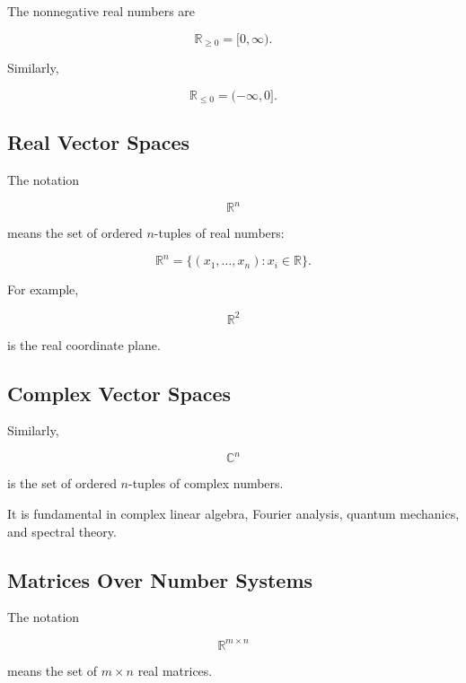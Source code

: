 The nonnegative real numbers are

\[
\boxed{
\mathbb{R}_{\geq0}
=
[0,\infty).
}
\]

Similarly,

\[
\boxed{
\mathbb{R}_{\leq0}
=
(-\infty,0].
}
\]

\subsection{Real Vector Spaces}
\label{subsec:real-vector-space-reference}

The notation

\[
\boxed{
\mathbb{R}^n
}
\]

means the set of ordered \(n\)-tuples of real numbers:

\[
\boxed{
\mathbb{R}^n
=
\{
(x_1,\ldots,x_n)
:
x_i\in\mathbb{R}
\}.
}
\]

For example,

\[
\mathbb{R}^2
\]

is the real coordinate plane.

\subsection{Complex Vector Spaces}
\label{subsec:complex-vector-space-reference}

Similarly,

\[
\boxed{
\mathbb{C}^n
}
\]

is the set of ordered \(n\)-tuples of complex numbers.

It is fundamental in complex linear algebra, Fourier analysis, quantum
mechanics, and spectral theory.

\subsection{Matrices Over Number Systems}
\label{subsec:matrices-over-number-systems}

The notation

\[
\boxed{
\mathbb{R}^{m\times n}
}
\]

means the set of \(m\times n\) real matrices.


